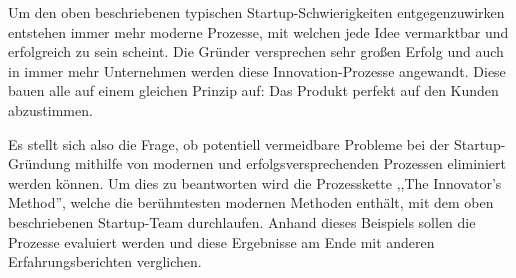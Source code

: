 Um den oben beschriebenen typischen Startup-Schwierigkeiten entgegenzuwirken entstehen immer mehr moderne Prozesse, mit welchen jede Idee vermarktbar und erfolgreich zu sein scheint. Die Gründer versprechen sehr großen Erfolg und auch in immer mehr Unternehmen werden diese Innovation-Prozesse angewandt. Diese bauen alle auf einem gleichen Prinzip auf: Das Produkt perfekt auf den Kunden abzustimmen.

Es stellt sich also die Frage, ob potentiell vermeidbare Probleme bei der Startup-Gründung mithilfe von modernen und erfolgsversprechenden Prozessen eliminiert werden können. Um dies zu beantworten wird die Prozesskette ,,The Innovator's Method'', welche die berühmtesten modernen Methoden enthält, mit dem oben beschriebenen Startup-Team durchlaufen. Anhand dieses Beispiels sollen die Prozesse evaluiert werden und diese Ergebnisse am Ende mit anderen Erfahrungsberichten verglichen. 